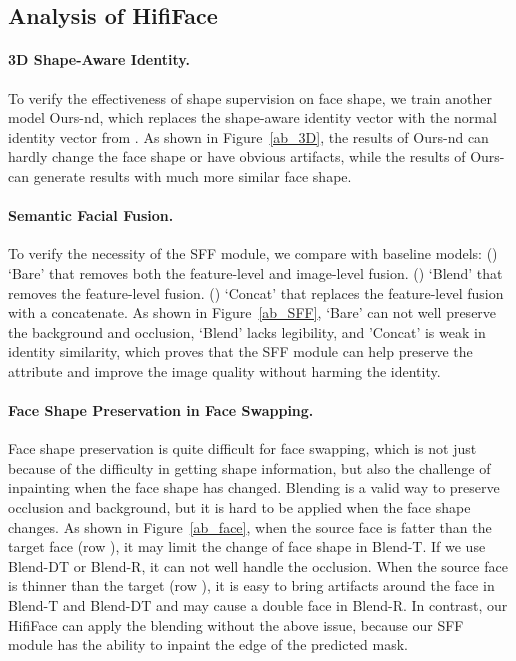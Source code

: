 \documentclass{article}
\begin{document}
\subsection{Analysis of HifiFace}

\paragraph{3D Shape-Aware Identity.}
To verify the effectiveness of shape supervision  on face shape, we train another model Ours-nd, which replaces the shape-aware identity vector with the normal identity vector from . 
As shown in Figure~\ref{ab_3D}, the results of Ours-nd can hardly change the face shape or have obvious artifacts, while the results of Ours- can generate results with much more similar face shape.


\paragraph{Semantic Facial Fusion.}
To verify the necessity of the SFF module, we compare with  baseline models: 
() `Bare' that removes both the feature-level and image-level fusion. 
() `Blend' that removes the feature-level fusion. 
() `Concat' that replaces the feature-level fusion with a concatenate. As shown in Figure~\ref{ab_SFF}, `Bare' can not well preserve the background and occlusion, `Blend' lacks legibility, and 'Concat' is weak in identity similarity, which proves that the SFF module can help preserve the attribute and improve the image quality without harming the identity. 


\paragraph{Face Shape Preservation in Face Swapping.} 
Face shape preservation is quite difficult for face swapping, which is not just because of the difficulty in getting shape information, but also the challenge of inpainting when the face shape has changed. Blending is a valid way to preserve occlusion and background, but it is hard to be applied when the face shape changes. 
As shown in Figure~\ref{ab_face}, when the source face is fatter than the target face (row ), it may limit the change of face shape in Blend-T. If we use Blend-DT or Blend-R, it can not well handle the occlusion. 
When the source face is thinner than the target (row ), it is easy to bring artifacts around the face in Blend-T and Blend-DT and may cause a double face in Blend-R. 
In contrast, our HifiFace can apply the blending without the above issue, because our SFF module has the ability to inpaint the edge of the predicted mask. 
\end{document}
